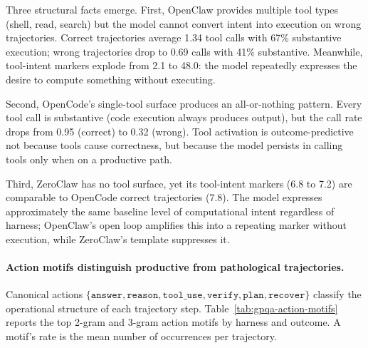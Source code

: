 
Three structural facts emerge.
First, OpenClaw provides multiple tool types (shell, read, search) but the model
cannot convert intent into execution on wrong trajectories.
Correct trajectories average 1.34 tool calls with 67\% substantive execution;
wrong trajectories drop to 0.69 calls with 41\% substantive.
Meanwhile, tool-intent markers explode from 2.1 to 48.0: the model repeatedly
expresses the desire to compute something without executing.

Second, OpenCode's single-tool surface produces an all-or-nothing pattern.
Every tool call is substantive (code execution always produces output), but the
call rate drops from 0.95 (correct) to 0.32 (wrong).
Tool activation is outcome-predictive not because tools cause correctness, but
because the model persists in calling tools only when on a productive path.

Third, ZeroClaw has no tool surface, yet its tool-intent markers (6.8 to 7.2)
are comparable to OpenCode correct trajectories (7.8).
The model expresses approximately the same baseline level of computational
intent regardless of harness; OpenClaw's open loop amplifies this into a
repeating marker without execution, while ZeroClaw's template suppresses it.

\paragraph{Action motifs distinguish productive from pathological trajectories.}

Canonical actions $\{\texttt{answer}, \texttt{reason}, \texttt{tool\_use},
\texttt{verify}, \texttt{plan}, \texttt{recover}\}$ classify the operational
structure of each trajectory step.
Table~\ref{tab:gpqa-action-motifs} reports the top 2-gram and 3-gram action
motifs by harness and outcome.
A motif's rate is the mean number of occurrences per trajectory.

